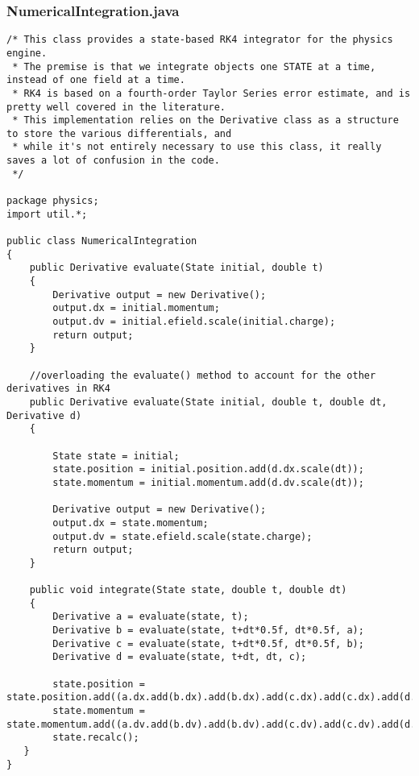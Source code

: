 \documentclass[10pt]{article}
\begin{document}
\subsubsection{NumericalIntegration.java}
\begin{verbatim}
/* This class provides a state-based RK4 integrator for the physics engine. 
 * The premise is that we integrate objects one STATE at a time, instead of one field at a time.
 * RK4 is based on a fourth-order Taylor Series error estimate, and is pretty well covered in the literature.
 * This implementation relies on the Derivative class as a structure to store the various differentials, and
 * while it's not entirely necessary to use this class, it really saves a lot of confusion in the code.
 */

package physics;
import util.*;

public class NumericalIntegration
{	
	public Derivative evaluate(State initial, double t)
	{
		Derivative output = new Derivative();
		output.dx = initial.momentum;
		output.dv = initial.efield.scale(initial.charge);
		return output;
	}
	
	//overloading the evaluate() method to account for the other derivatives in RK4	
	public Derivative evaluate(State initial, double t, double dt, Derivative d)
	{

		State state = initial;
	    state.position = initial.position.add(d.dx.scale(dt));
	    state.momentum = initial.momentum.add(d.dv.scale(dt)); 

	    Derivative output = new Derivative();
	    output.dx = state.momentum;
	    output.dv = state.efield.scale(state.charge);
	    return output;
	}
	
	public void integrate(State state, double t, double dt)
    {
        Derivative a = evaluate(state, t);      
        Derivative b = evaluate(state, t+dt*0.5f, dt*0.5f, a);
        Derivative c = evaluate(state, t+dt*0.5f, dt*0.5f, b);
        Derivative d = evaluate(state, t+dt, dt, c);

        state.position = state.position.add((a.dx.add(b.dx).add(b.dx).add(c.dx).add(c.dx).add(d.dx)).scale(dt/6));
        state.momentum = state.momentum.add((a.dv.add(b.dv).add(b.dv).add(c.dv).add(c.dv).add(d.dv)).scale(dt/6));
        state.recalc();    
   }
}
\end{verbatim}
\end{document}
